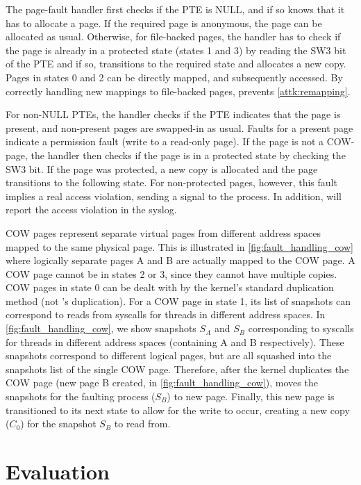 \documentclass[letterpaper,twocolumn,10pt, anonymous]{article}
\begin{document}
The page-fault handler first checks if the PTE is NULL, and if so 
knows that it has to allocate a page. 
If the required page is anonymous, the page can be allocated as usual.
Otherwise, for file-backed pages, the handler has to check if the 
page is already in a protected state (states 1 and 3) by reading 
the SW3 bit of the PTE and if so, transitions to the required state
and allocates a new copy. 
Pages in states 0 and 2 can be directly mapped, and subsequently
accessed.
By correctly handling new mappings to file-backed pages, \tiktok
prevents \autoref{attk:remapping}. 

For non-NULL PTEs, the handler checks if the PTE indicates that the 
page is present, and non-present pages are swapped-in as usual.
Faults for a present page indicate a permission fault (write to 
a read-only page).
If the page is not a COW-page, the handler then checks if the page
is in a protected state by checking the SW3 bit.
If the page was protected, a new copy is allocated and the page 
transitions to the following state.
For non-protected pages, however, this fault implies a real access
violation, sending a signal to the process.
In addition, \tiktok will report the access violation in the syslog.

COW pages represent separate virtual pages from different 
address spaces mapped to the same physical page.
This is illustrated in \autoref{fig:fault_handling_cow} where 
logically separate pages A and B are actually mapped to the COW
page.
A COW page cannot be in states 2 or 3, since they cannot have multiple
\tiktok copies.
COW pages in state 0 can be dealt with by the kernel's standard
duplication method (not \tiktok's duplication).
For a COW page in state 1, its list of snapshots can correspond to 
reads from syscalls for threads in different address spaces.
In \autoref{fig:fault_handling_cow}, we show snapshots $S_A$ and 
$S_B$ corresponding to syscalls for threads in different address 
spaces (containing A and B respectively).
These snapshots correspond to different logical pages, but are 
all squashed into the snapshots list of the single COW page. 
Therefore, after the kernel duplicates the COW page (new page
B created, in \autoref{fig:fault_handling_cow}), \tiktok moves 
the snapshots for the faulting process ($S_B$) to new page.
Finally, this new page is transitioned to its next state to allow 
for the write to occur, creating a new copy ($C_0$) for the
snapshot $S_B$ to read from.


\section{Evaluation}
\end{document}

